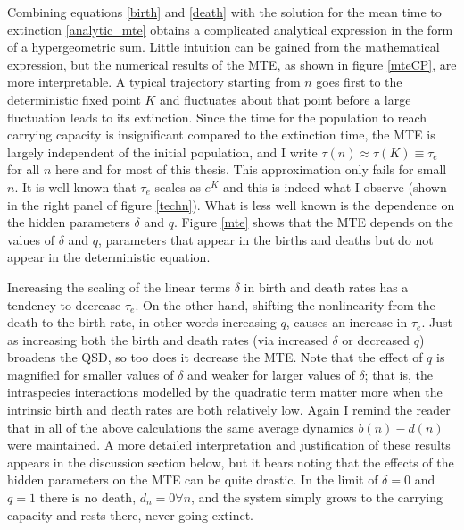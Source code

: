 Combining equations \ref{birth} and \ref{death} with the solution for the mean time to extinction \ref{analytic_mte} obtains a complicated analytical expression in the form of a hypergeometric sum. %
Little intuition can be gained from the mathematical expression, but the numerical results of the MTE, as shown in figure \ref{mteCP}, are more interpretable. 
A typical trajectory starting from $n$ goes first to the deterministic fixed point $K$ and fluctuates about that point before a large fluctuation leads to its extinction. 
Since the time for the population to reach carrying capacity is insignificant compared to the extinction time, the MTE is largely independent of the initial population, and I write $\tau(n) \approx \tau(K) \equiv \tau_e$ for all $n$ here and for most of this thesis. %
This approximation only fails for small $n$. %
It is well known that $\tau_e$ scales as $e^K$ \cite{Ovaskainen2010} and this is indeed what I observe (shown in the right panel of figure \ref{techn}). %
What is less well known is the dependence on the hidden parameters $\delta$ and $q$. %
Figure \ref{mte} shows that the MTE depends on the values of $\delta$ and $q$, parameters that appear in the births and deaths but do not appear in the deterministic equation. %

Increasing the scaling of the linear terms $\delta$ in birth and death rates has a tendency to decrease $\tau_e$. 
On the other hand, shifting the nonlinearity from the death to the birth rate, in other words increasing $q$, causes an increase in $\tau_e$. 
Just as increasing both the birth and death rates (via increased $\delta$ or decreased $q$) broadens the QSD, so too does it decrease the MTE. 
Note that the effect of $q$ is magnified for smaller values of $\delta$ and weaker for larger values of $\delta$; that is, the intraspecies interactions modelled by the quadratic term matter more when the intrinsic birth and death rates are both relatively low. 
Again I remind the reader that in all of the above calculations the same average dynamics $b(n)-d(n)$ were maintained. 
A more detailed interpretation and justification of these results appears in the discussion section below, but it bears noting that the effects of the hidden parameters on the MTE can be quite drastic. 
In the limit of $\delta=0$ and $q=1$ there is no death, $d_n=0 \forall n$, and the system simply grows to the carrying capacity and rests there, never going extinct. 


